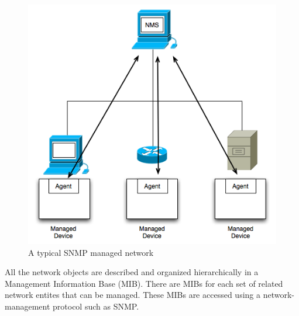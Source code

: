 \begin{figure}[H]
\centering
	\includegraphics[width=.7\linewidth]{Pictures/Chapter3/snmp.png}
	\caption{A typical SNMP managed network}
\end{figure}

All the network objects are described and organized hierarchically in a Management Information Base (MIB). There are MIBs for each set of related network entites that can be managed. These MIBs are accessed using a network-management protocol such as SNMP.

